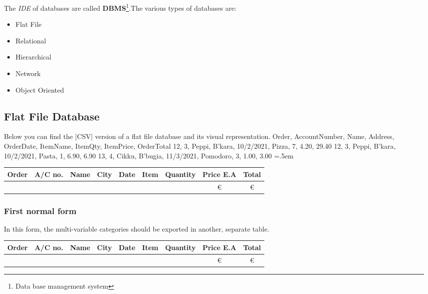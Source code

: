 \documentclass{article}
\newenvironment{lcverbatim}
{\SaveVerbatim{cverb}}
{\endSaveVerbatim
	\flushleft\fboxrule=0pt\fboxsep=.5em
	\colorbox{cverbbg}{%
		\makebox[\dimexpr\linewidth-2\fboxsep][l]{\BUseVerbatim{cverb}}%
	}
	\endflushleft
}
\begin{document}
		The \textit{IDE} of databases are called \textbf{DBMS}\footnote{Data base management system}.The various types of databases are: 
		\begin{itemize}
			\item{Flat File}
			\item{Relational}
			\item{Hierarchical}
			\item{Network}
			\item{Object Oriented}
		\end{itemize}
	\subsection{Flat File Database}
	Below you can find the \cverb|CSV| version of a flat file database and its visual representation.
\begin{lcverbatim}
Order, AccountNumber, Name, Address, OrderDate, ItemName, ItemQty, ItemPrice, OrderTotal
12, 3, Peppi, B'kara, 10/2/2021, Pizza, 7, 4.20, 29.40
12, 3, Peppi, B'kara, 10/2/2021, Pasta, 1, 6.90, 6.90 
13, 4, Cikku, B'bugia, 11/3/2021, Pomodoro, 3, 1.00, 3.00
\end{lcverbatim}
\begin{center}
		\begin{tabular}{|c|c|c|c|c|c|c|c|c|}%
		\hline
		\bfseries Order & \bfseries A/C no. & \bfseries Name &\bfseries City &\bfseries Date & \bfseries Item &\bfseries Quantity &\bfseries Price E.A &\bfseries Total 
		\csvreader[head to column names]{flat_file.csv}{}%
		{\\\hline\Order & \AccountNumber &  \Name & \Address & \OrderDate & \ItemName & \ItemQty & \euro\ItemPrice & \euro\OrderTotal}
		\\\hline
	\end{tabular}
\end{center}
\subsubsection{First normal form}
In this form, the multi-variable categories should be exported in another, separate table.
\begin{multicols}{2}
\begin{center}
	\begin{tabular}{|c|c|c|c|c|c|c|c|c|}%
		\hline
		\bfseries Order & \bfseries A/C no. & \bfseries Name &\bfseries City &\bfseries Date & \bfseries Item &\bfseries Quantity &\bfseries Price E.A &\bfseries Total 
		\csvreader[head to column names]{flat_file.csv}{}%
		{\\\hline\Order & \AccountNumber &  \Name & \Address & \OrderDate & \ItemName & \ItemQty & \euro\ItemPrice & \euro\OrderTotal}
		\\\hline
	\end{tabular}
\end{center}
\end{multicols}
\end{document}
